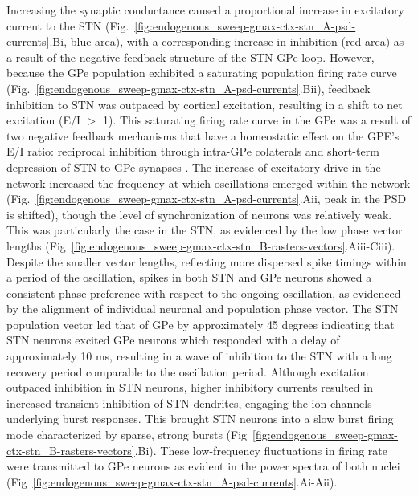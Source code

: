 Increasing the synaptic conductance caused a proportional increase in excitatory current to the STN (Fig.~\ref{fig:endogenous_sweep-gmax-ctx-stn_A-psd-currents}.Bi, blue area), with a corresponding increase in inhibition (red area) as a result of the negative feedback structure of the STN-GPe loop. However, because the GPe population exhibited a saturating population firing rate curve (Fig.~\ref{fig:endogenous_sweep-gmax-ctx-stn_A-psd-currents}.Bii), feedback inhibition to STN was outpaced by cortical excitation, resulting in a shift to net excitation (E/I $>$ 1). This saturating firing rate curve in the GPe was a result of two negative feedback mechanisms that have a homeostatic effect on the GPE's E/I ratio: reciprocal inhibition through intra-GPe colaterals and short-term depression of STN to GPe synapses \cite{hanson_short-term_2002}.
The increase of excitatory drive in the network increased the frequency at which oscillations emerged within the network (Fig.~\ref{fig:endogenous_sweep-gmax-ctx-stn_A-psd-currents}.Aii, peak in the PSD is shifted), though the level of synchronization of neurons was relatively weak. This was particularly the case in the STN, as evidenced by the low phase vector lengths (Fig~\ref{fig:endogenous_sweep-gmax-ctx-stn_B-rasters-vectors}.Aiii-Ciii). Despite the smaller vector lengths, reflecting more dispersed spike timings within a period of the oscillation, spikes in both STN and GPe neurons showed a consistent phase preference with respect to the ongoing oscillation, as evidenced by the alignment of individual neuronal and population phase vector. The STN population vector led that of GPe by approximately 45 degrees indicating that STN neurons excited GPe neurons which responded with a delay of approximately 10 ms, resulting in a wave of inhibition to the STN with a long recovery period comparable to the oscillation period.
Although excitation outpaced inhibition in STN neurons, higher inhibitory currents resulted in increased transient inhibition of STN dendrites, engaging the ion channels underlying burst responses. This brought STN neurons into a slow burst firing mode characterized by sparse, strong bursts (Fig~\ref{fig:endogenous_sweep-gmax-ctx-stn_B-rasters-vectors}.Bi). These low-frequency fluctuations in firing rate were transmitted to GPe neurons as evident in the power spectra of both nuclei (Fig~\ref{fig:endogenous_sweep-gmax-ctx-stn_A-psd-currents}.Ai-Aii).\\


%
%
%
%
%
%
%
%

%
%
%

